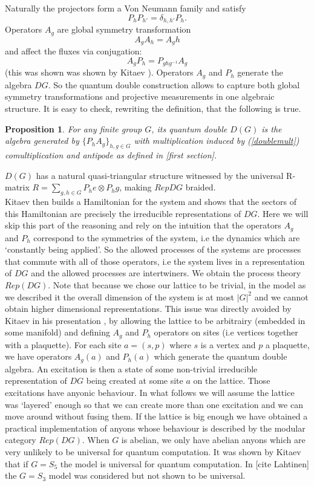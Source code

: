 \documentclass{article}
\newtheorem{proposition}[theorem]{Proposition}
\begin{document}
Naturally the projectors form a Von Neumann family and satisfy 
$$P_hP_{h'}= \delta_{h,h'} P_h.$$ 
Operators $A_g$ are global symmetry transformation 
$$A_gA_h = A_gh$$
and affect the fluxes via conjugation:
\begin{equation}\label{doublemult}
A_gP_h = P_{ghg^{-1}}A_g
\end{equation}
(this was shown was shown by Kitaev \cite{Kitaev03}). Operators $A_g$ and $P_h$ generate the algebra $DG$. So the quantum double construction allows to capture both global symmetry transformations and projective measurements in one algebraic structure. It is easy to check, rewriting the definition, that the following is true. 
\begin{proposition}
	For any finite group $G$, its quantum double $D(G)$ is the algebra generated by $\{P_hA_g\}_{h,g\in G}$ with multiplication induced by (\ref{doublemult}) comultiplication and antipode as defined in [first section]. 
\end{proposition}
$D(G)$ has a natural quasi-triangular structure witnessed by the universal R-matrix $R=\sum_{g,h \in G}P_he \otimes P_hg$, making $RepDG$ braided.\\
Kitaev then builds a Hamiltonian for the system and shows that the sectors of this Hamiltonian are precisely the irreducible representations of $DG$. Here we will skip this part of the reasoning and rely on the intuition that the operators $A_g$ and $P_h$ correspond to the symmetries of the system, i.e the dynamics which are `constantly being applied'. So the allowed processes of the systems are processes that commute with all of those operators, i.e the system lives in a representation of $DG$ and the allowed processes are intertwiners. We obtain the process theory $Rep(DG)$. Note that because we chose our lattice to be trivial, in the model as we described it the overall dimension of the system is at most $|G|^2$ and we cannot obtain higher dimensional representations. This issue was directly avoided by Kitaev in his presentation \cite{Kitaev03}, by allowing the lattice to be arbitrairy (embedded in some manifold) and defining $A_g$ and $P_h$ operators on sites (i.e vertices together with a plaquette). For each site $a=(s,p)$ where $s$ is a vertex and $p$ a plaquette, we have operators $A_g(a)$ and $P_h(a)$ which generate the quantum double algebra. An excitation is then a state of some non-trivial irreducible representation of $DG$ being created at some site $a$ on the lattice. Those excitations have anyonic behaviour. In what follows we will assume the lattice was `layered' enough so that we can create more than one excitation and we can move around without fusing them. If the lattice is big enough we have obtained a practical implementation of anyons whose behaviour is described by the modular category $Rep(DG)$. When $G$ is abelian, we only have abelian anyons which are very unlikely to be universal for quantum computation. It was shown by Kitaev that if $G=S_5$ the model is universal for quantum computation. In [cite Lahtinen] the $G=S_3$ model was considered but not shown to be universal.\\  
\end{document}
